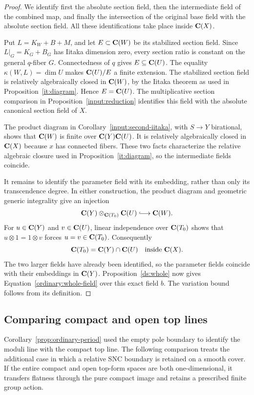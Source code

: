 \begin{proof}
We identify first the absolute section field, then the intermediate
field of the combined map, and finally the intersection of the
original base field with the absolute section field. All these
identifications take place inside $\mathbf C(X)$.

Put $L=K_W+B+M$, and let $E\subset\mathbf C(W)$ be its stabilized
section field. Since $L|_G=K_G+B_G$ has Iitaka dimension zero,
every section ratio is constant on the general $q$-fiber $G$.
Connectedness of $q$ gives $E\subseteq\mathbf C(U)$. The equality
$\kappa(W,L)=\dim U$ makes $\mathbf C(U)/E$ a finite extension.
The stabilized section field is relatively algebraically closed
in $\mathbf C(W)$, by the Iitaka theorem as used in
Proposition~\ref{it:diagram}. Hence $E=\mathbf C(U)$. The multiplicative
section comparison in Proposition~\ref{input:reduction} identifies
this field with the absolute canonical section field of $X$.

The product diagram in Corollary~\ref{input:second-iitaka}, with
$S\to Y$ birational, shows that $\mathbf C(W)$ is finite over
$\mathbf C(Y)\mathbf C(U)$. It is relatively algebraically closed in $\mathbf C(X)$
because $x$ has connected fibers. These two facts characterize
the relative algebraic closure used in
Proposition~\ref{it:diagram}, so the intermediate fields coincide.

It remains to identify the parameter field with its embedding,
rather than only its transcendence degree. In either construction,
the product diagram and geometric generic integrality give an
injection
\[
 \C(Y)\otimes_{\C(T_0)}\C(U)\lhook\joinrel\longrightarrow\C(W).
\]
For $u\in\mathbf C(Y)$ and $v\in\mathbf C(U)$, linear independence over
$\mathbf C(T_0)$ shows that $u\otimes1=1\otimes v$ forces
$u=v\in\mathbf C(T_0)$. Consequently
\[
                \mathbf C(T_0)=\mathbf C(Y)\cap\mathbf C(U)\quad\text{inside }\mathbf C(X).
\]
The two larger fields have already been identified, so the parameter
fields coincide with their embeddings in $\mathbf C(Y)$. Proposition~\ref{ds:whole}
now gives Equation~\eqref{ordinary:whole-field} over this exact
field $b$. The variation bound follows from its definition.
\end{proof}

\subsection{Comparing compact and open top lines}

Corollary~\ref{prop:ordinary-period} used the empty pole boundary
to identify the moduli line with the compact top line. The following
comparison treats the additional case in which a relative SNC
boundary is retained on a smooth cover. If the entire compact and
open top-form spaces are both one-dimensional, it transfers
flatness through the pure compact image and retains a prescribed
finite group action.

